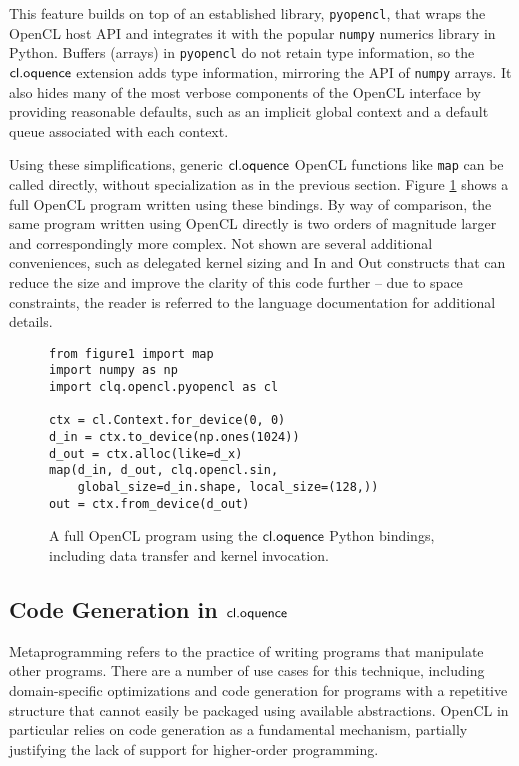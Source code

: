 \documentclass[10pt, conference, compsocconf]{IEEEtran}
\begin{document}
This feature builds on top of an established library, \verb|pyopencl|, that wraps the OpenCL host API and integrates it with the popular \verb|numpy| numerics library in Python. Buffers (arrays) in \verb|pyopencl| do not retain type information, so the $\textsf{cl.oquence}$ extension adds type information, mirroring the API of \verb|numpy| arrays. It also hides many of the most verbose components of the OpenCL interface by providing reasonable defaults, such as an implicit global context and a default queue associated with each context. 

Using these simplifications, generic $\textsf{cl.oquence}$ OpenCL functions like \verb|map| can be called directly, without specialization as in the previous section. Figure \ref{py} shows a full OpenCL program written using these bindings. By way of comparison, the same program written using OpenCL directly is two orders of magnitude larger and correspondingly more complex. Not shown are several additional conveniences, such as delegated kernel sizing and In and Out constructs that can reduce the size and improve the clarity of this code further -- due to space constraints, the reader is referred to the language documentation for additional details.

\begin{figure}
\small{\begin{verbatim}
from figure1 import map
import numpy as np
import clq.opencl.pyopencl as cl

ctx = cl.Context.for_device(0, 0)
d_in = ctx.to_device(np.ones(1024))
d_out = ctx.alloc(like=d_x)
map(d_in, d_out, clq.opencl.sin, 
    global_size=d_in.shape, local_size=(128,))
out = ctx.from_device(d_out)
\end{verbatim}}
\caption{A full OpenCL program using the $\textsf{cl.oquence}$ Python bindings, including data transfer and kernel invocation.}
\label{py}
\end{figure}

\subsection{Code Generation in $\textsf{cl.oquence}$}
Metaprogramming refers to the practice of writing programs that manipulate other programs. There are a number of use cases for this technique, including domain-specific optimizations and code generation for programs with a repetitive structure that cannot easily be packaged using available abstractions. OpenCL in particular relies on code generation as a fundamental mechanism, partially justifying the lack of support for higher-order programming.
\end{document}
